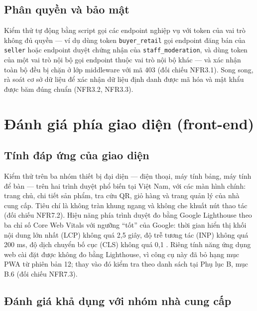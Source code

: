 \subsection{Phân quyền và bảo mật}

Kiểm thử tự động bằng script gọi các endpoint nghiệp vụ với token của vai trò không đủ quyền --- ví dụ dùng token \texttt{buyer\_retail} gọi endpoint đăng bán của \texttt{seller} hoặc endpoint duyệt chứng nhận của \texttt{staff\_moderation}, và dùng token của một vai trò nội bộ gọi endpoint thuộc vai trò nội bộ khác --- và xác nhận toàn bộ đều bị chặn ở lớp middleware với mã 403 (đối chiếu NFR3.1). Song song, rà soát cơ sở dữ liệu để xác nhận dữ liệu định danh được mã hóa và mật khẩu được băm đúng chuẩn (NFR3.2, NFR3.3).


\section{Đánh giá phía giao diện (front-end)}
\label{sec:danhgiaux}

\subsection{Tính đáp ứng của giao diện}

Kiểm thử trên ba nhóm thiết bị đại diện --- điện thoại, máy tính bảng, máy tính để bàn --- trên hai trình duyệt phổ biến tại Việt Nam, với các màn hình chính: trang chủ, chi tiết sản phẩm, tra cứu QR, giỏ hàng và trang quản lý của nhà cung cấp. Tiêu chí là không tràn khung ngang và không che khuất nút thao tác (đối chiếu NFR7.2). Hiệu năng phía trình duyệt đo bằng Google Lighthouse theo ba chỉ số Core Web Vitals với ngưỡng ``tốt'' của Google: thời gian hiển thị khối nội dung lớn nhất (LCP) không quá 2,5 giây, độ trễ tương tác (INP) không quá 200 ms, độ dịch chuyển bố cục (CLS) không quá 0,1 \parencite{webdev_vitals}. Riêng tính năng ứng dụng web cài đặt được không đo bằng Lighthouse, vì công cụ này đã bỏ hạng mục PWA từ phiên bản 12; thay vào đó kiểm tra theo danh sách tại Phụ lục B, mục B.6 (đối chiếu NFR7.3).


\subsection{Đánh giá khả dụng với nhóm nhà cung cấp}

